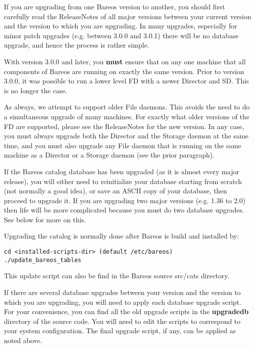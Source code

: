 If you are upgrading from one Bareos version to another, you should first
carefully read the ReleaseNotes of all major versions between your current
version and the version to which you are upgrading.  In many upgrades,
especially for minor patch upgrades (e.g. between 3.0.0 and 3.0.1) there
will be no database upgrade, and hence the process is rather simple.

With version 3.0.0 and later, you {\bf must} ensure that on any one
machine that all components of Bareos are running on exactly the
same version.  Prior to version 3.0.0, it was possible to run a
lower level FD with a newer Director and SD.  This is no longer the
case.

As always, we attempt to support older File daemons. This avoids the
need to do a simultaneous upgrade of many machines. For exactly what
older versions of the FD are supported, please see the ReleaseNotes
for the new version.  In any case, you must always upgrade both the
Director and the Storage daemon at the same time, and you must also
upgrade any File daemon that is running on the same machine as a Director
or a Storage daemon (see the prior paragraph).

If the Bareos catalog
database has been upgraded (as it is almost every major release), you will
either need to reinitialize your database starting from scratch (not
normally a good idea), or save an ASCII copy of your database, then proceed
to upgrade it. If you are upgrading two major versions (e.g. 1.36 to 2.0)
then life will be more complicated because you must do two database
upgrades. See below for more on this.

Upgrading the catalog is normally done after Bareos is build and installed
by:

\begin{verbatim}
cd <installed-scripts-dir> (default /etc/bareos)
./update_bareos_tables
\end{verbatim}

This update script can also be find in the Bareos source src/cats
directory.

If there are several database upgrades between your version and the
version to which you are upgrading, you will need to apply each database
upgrade script. For your convenience, you can find all the old upgrade scripts
in the {\bf upgradedb} directory of the source code. You will need to edit the
scripts to correspond to your system configuration. The final upgrade script,
if any, can be applied as noted above.

